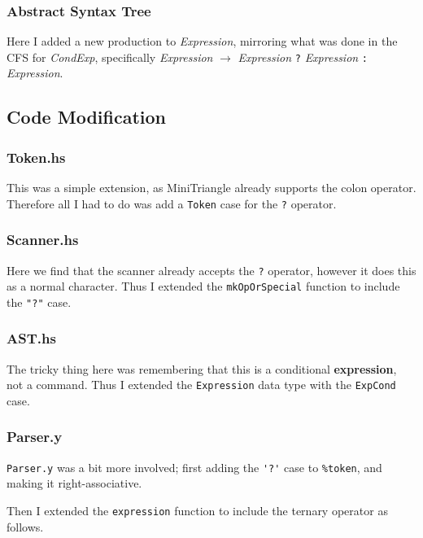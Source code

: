 \documentclass[12pt]{article}
\newcommand{\lstin}[3]{
  
}
\begin{document}
\subsubsection{Abstract Syntax Tree}
Here I added a new production to \textit{Expression}, mirroring what was done in the CFS for \textit{CondExp}, specifically \textit{Expression} $\rightarrow$ \textit{Expression} \verb|?| \textit{Expression} \verb|:| \textit{Expression}.

\subsection{Code Modification}
\subsubsection{Token.hs}
This was a simple extension, as MiniTriangle already supports the colon operator. 
Therefore all I had to do was add a \verb|Token| case for the \verb|?| operator.

\lstin{33}{33}{Token.hs}

\subsubsection{Scanner.hs}
Here we find that the scanner already accepts the \verb|?| operator, however it does this as a normal character. 
Thus I extended the \verb|mkOpOrSpecial| function to include the \verb|"?"| case.

\lstin{132}{132}{Scanner.hs}

\subsubsection{AST.hs}
The tricky thing here was remembering that this is a conditional \textbf{expression}, not a command. 
Thus I extended the \verb|Expression| data type with the \verb|ExpCond| case.

\lstin{162}{167}{AST.hs}

\subsubsection{Parser.y}
\verb|Parser.y| was a bit more involved; first adding the \verb|'?'| case to \verb|%token|, and making it right-associative.

\lstin{74}{74}{Parser.y}
\lstin{99}{99}{Parser.y}

Then I extended the \verb|expression| function to include the ternary operator as follows.
\end{document}
